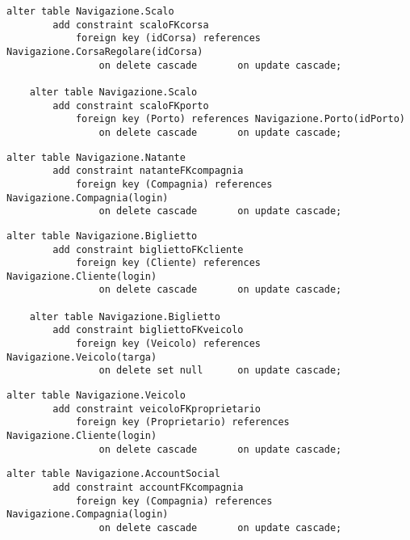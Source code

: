 \begin{lstlisting}[style=sqlstyle, title = {Aggiunti vincoli di chiave esterna per la tabella Scalo}]
    alter table Navigazione.Scalo
        add constraint scaloFKcorsa
            foreign key (idCorsa) references Navigazione.CorsaRegolare(idCorsa)
                on delete cascade       on update cascade;
    
    alter table Navigazione.Scalo
        add constraint scaloFKporto
            foreign key (Porto) references Navigazione.Porto(idPorto)
                on delete cascade       on update cascade;
\end{lstlisting}

\begin{lstlisting}[style=sqlstyle, title = {Aggiunto vincolo di chiave esterna per la tabella Natante}]
    alter table Navigazione.Natante
        add constraint natanteFKcompagnia
            foreign key (Compagnia) references Navigazione.Compagnia(login)
                on delete cascade       on update cascade;
\end{lstlisting}

\begin{lstlisting}[style=sqlstyle, title = {Aggiunti vincoli di chiave esterna per la tabella Biglietto}]
    alter table Navigazione.Biglietto
        add constraint bigliettoFKcliente
            foreign key (Cliente) references Navigazione.Cliente(login)
                on delete cascade       on update cascade;
    
    alter table Navigazione.Biglietto
        add constraint bigliettoFKveicolo
            foreign key (Veicolo) references Navigazione.Veicolo(targa)
                on delete set null      on update cascade;
\end{lstlisting}

\begin{lstlisting}[style=sqlstyle, title = {Aggiunto vincolo di chiave esterna per la tabella Veicolo}]
    alter table Navigazione.Veicolo
        add constraint veicoloFKproprietario
            foreign key (Proprietario) references Navigazione.Cliente(login)
                on delete cascade       on update cascade;
\end{lstlisting}

\begin{lstlisting}[style=sqlstyle, title = {Aggiunto vincolo di chiave esterna per la tabella AccountSocial}]
    alter table Navigazione.AccountSocial
        add constraint accountFKcompagnia
            foreign key (Compagnia) references Navigazione.Compagnia(login)
                on delete cascade       on update cascade;
\end{lstlisting}

